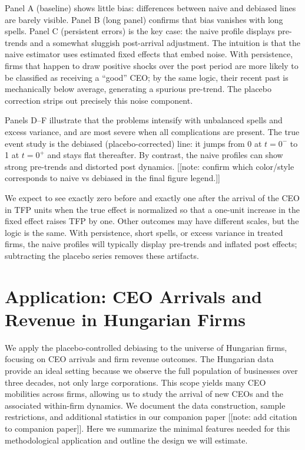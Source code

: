 \documentclass[11pt,a4paper]{article}
\begin{document}
Panel A (baseline) shows little bias: differences between naive and debiased lines are barely visible. Panel B (long panel) confirms that bias vanishes with long spells. Panel C (persistent errors) is the key case: the naive profile displays pre-trends and a somewhat sluggish post-arrival adjustment. The intuition is that the naive estimator uses estimated fixed effects that embed noise. With persistence, firms that happen to draw positive shocks over the post period are more likely to be classified as receiving a “good” CEO; by the same logic, their recent past is mechanically below average, generating a spurious pre-trend. The placebo correction strips out precisely this noise component.

Panels D–F illustrate that the problems intensify with unbalanced spells and excess variance, and are most severe when all complications are present. The true event study is the debiased (placebo-corrected) line: it jumps from 0 at $t=0^{-}$ to 1 at $t=0^{+}$ and stays flat thereafter. By contrast, the naive profiles can show strong pre-trends and distorted post dynamics. [[note: confirm which color/style corresponds to naive vs debiased in the final figure legend.]]

We expect to see exactly zero before and exactly one after the arrival of the CEO in TFP units when the true effect is normalized so that a one-unit increase in the fixed effect raises TFP by one. Other outcomes may have different scales, but the logic is the same. With persistence, short spells, or excess variance in treated firms, the naive profiles will typically display pre-trends and inflated post effects; subtracting the placebo series removes these artifacts.

\section{Application: CEO Arrivals and Revenue in Hungarian Firms}

We apply the placebo-controlled debiasing to the universe of Hungarian firms, focusing on CEO arrivals and firm revenue outcomes. The Hungarian data provide an ideal setting because we observe the full population of businesses over three decades, not only large corporations. This scope yields many CEO mobilities across firms, allowing us to study the arrival of new CEOs and the associated within-firm dynamics. We document the data construction, sample restrictions, and additional statistics in our companion paper [[note: add citation to companion paper]]. Here we summarize the minimal features needed for this methodological application and outline the design we will estimate.
\end{document}
